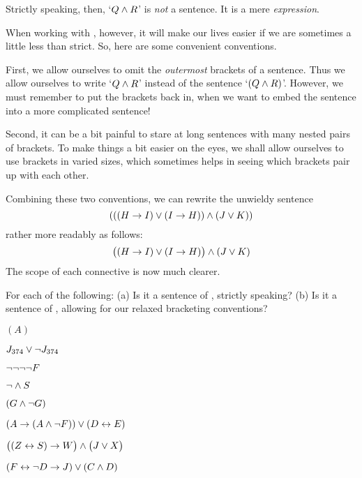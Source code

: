 Strictly speaking, then, `$Q \wedge R$' is \emph{not} a sentence. It is a mere \emph{expression}.

When working with \TFL, however, it will make our lives easier if we are sometimes a little less than strict. So, here are some convenient conventions.

First,  we allow ourselves to omit the \emph{outermost} brackets of a sentence. Thus we allow ourselves to write `$Q \wedge R$' instead of the sentence `$(Q \wedge R)$'. However, we must remember to put the brackets back in, when we want to embed the sentence into a more complicated sentence!

Second, it can be a bit painful to stare at long sentences with many nested pairs of brackets. To make things a bit easier on the eyes, we shall allow ourselves to use brackets in varied sizes, which sometimes helps in seeing which brackets pair up with each other.


Combining these two conventions, we can rewrite the unwieldy sentence
$$(((H \rightarrow I) \vee (I \rightarrow H)) \wedge (J \vee K))$$
rather more readably as follows:
$$\bigl( (H \rightarrow I) \vee (I \rightarrow H) \bigr) \wedge (J \vee K)$$
The scope of each connective is now much clearer.



\practiceproblems

\solutions
\problempart
\label{pr.wiffTFL}
For each of the following: (a) Is it a sentence of \TFL, strictly speaking? (b) Is it a sentence of \TFL, allowing for our relaxed bracketing conventions?
\begin{earg}
\item $(A)$
\item $J_{374} \vee \neg J_{374}$
\item $\neg \neg \neg \neg F$
\item $\neg \wedge S$
\item $(G \wedge \neg G)$
\item $(A \rightarrow (A \wedge \neg F)) \vee (D \leftrightarrow E)$
\item $\bigl( (Z \leftrightarrow S) \rightarrow W \bigr) \wedge \bigl(J \vee X\bigr)$
\item $(F \leftrightarrow \neg D \rightarrow J) \vee (C \wedge D)$
\end{earg}

